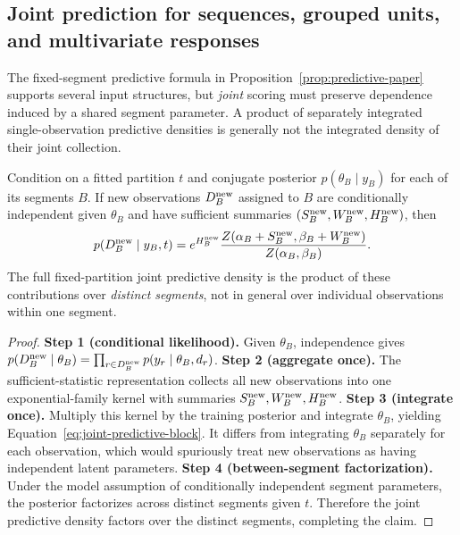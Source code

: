 \subsection{Joint prediction for sequences, grouped units, and multivariate responses}
\label{sec:prediction-extensions}
The fixed-segment predictive formula in Proposition~\ref{prop:predictive-paper} supports several input structures, but \emph{joint} scoring must preserve dependence induced by a shared segment parameter. A product of separately integrated single-observation predictive densities is generally not the integrated density of their joint collection.

\begin{proposition}
\label{prop:joint-predictive-paper}
Condition on a fitted partition $t$ and conjugate posterior $p(\theta_B\mid y_B)$ for each of its segments $B$. If new observations $D_B^{\rm new}$ assigned to $B$ are conditionally independent given $\theta_B$ and have sufficient summaries $(S_B^{\rm new},W_B^{\rm new},H_B^{\rm new})$, then
\begin{equation}
p(D_B^{\rm new}\mid y_B,t)
=e^{H_B^{\rm new}}\frac{Z(\alpha_B+S_B^{\rm new},\beta_B+W_B^{\rm new})}{Z(\alpha_B,\beta_B)}.
\label{eq:joint-predictive-block}
\end{equation}
The full fixed-partition joint predictive density is the product of these contributions over \emph{distinct segments}, not in general over individual observations within one segment.
\end{proposition}
\begin{proof}
\textbf{Step 1 (conditional likelihood).} Given $\theta_B$, independence gives $p(D_B^{\rm new}\mid\theta_B)=\prod_{r\in D_B^{\rm new}}p(y_r\mid\theta_B,d_r)$.
\textbf{Step 2 (aggregate once).} The sufficient-statistic representation collects all new observations into one exponential-family kernel with summaries $S_B^{\rm new},W_B^{\rm new},H_B^{\rm new}$.
\textbf{Step 3 (integrate once).} Multiply this kernel by the training posterior and integrate $\theta_B$, yielding Equation~\eqref{eq:joint-predictive-block}. It differs from integrating $\theta_B$ separately for each observation, which would spuriously treat new observations as having independent latent parameters.
\textbf{Step 4 (between-segment factorization).} Under the model assumption of conditionally independent segment parameters, the posterior factorizes across distinct segments given $t$. Therefore the joint predictive density factors over the distinct segments, completing the claim.
\end{proof}


